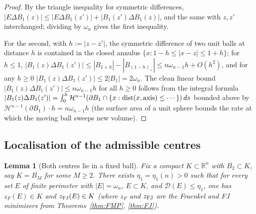 \documentclass[11pt]{article}
\newtheorem{lemma}[theorem]{Lemma}
\theoremstyle{definition}
\newcommand{\R}{\mathbb{R}}
\newcommand{\Hn}{\mathcal H^{n-1}}
\newcommand{\dD}{\mathcal D}
\begin{document}
\begin{proof}
By the triangle inequality for symmetric differences,
\(|E\Delta B_1(z)|\le|E\Delta B_1(z')|+|B_1(z')\Delta B_1(z)|\), and
the same with \(z,z'\) interchanged; dividing by \(\omega_n\) gives
the first inequality.

For the second, with \(h:=|z-z'|\), the symmetric difference of two
unit balls at distance \(h\) is contained in the closed annulus
\(\{x:1-h\le|x-z|\le 1+h\}\); for \(h\le 1\),
\(|B_1(z)\Delta B_1(z')|\le |B_{1+h}|-|B_{(1-h)_+}|
\le n\omega_{n-1}h+O(h^{2})\), and for any \(h\ge0\)
\(|B_1(z)\Delta B_1(z')|\le 2|B_{1}|=2\omega_n\).  The clean linear
bound \(|B_1(z)\Delta B_1(z')|\le n\omega_{n-1}h\) for all
\(h\ge0\) follows from the integral formula
\(|B_1(z)\Delta B_1(z')|=\int_{0}^{h}\Hn(\partial B_1\cap
\{x:{\rm dist}(x,\text{axis})\le\cdots\})\,ds\) bounded above by
\(\Hn(\partial B_1)\cdot h = n\omega_{n-1}h\) (the surface area of a
unit sphere bounds the rate at which the moving ball sweeps new
volume).
\end{proof}

\subsection{Localisation of the admissible centres}

\begin{lemma}[Both centres lie in a fixed ball]\label{lem:localise-centres}
Fix a compact \(K\subset\R^{n}\) with \(\overline{B_{2}}\subset K\),
say \(K=\overline{B_{M}}\) for some \(M\ge2\).  There exists
\(\eta_{1}=\eta_{1}(n)>0\) such that for every set \(E\) of finite
perimeter with \(|E|=\omega_n\), \(E\subset K\), and
\(\dD(E)\le\eta_{1}\), one has \(z_{F}(E)\in K\) and
\(z_{\rm FJ}(E)\in K\) (where \(z_F\) and \(z_{\rm FJ}\) are the
Fraenkel and FJ minimisers from Theorems~\ref{thm:FMP},
\ref{thm:FJ}).
\end{lemma}
\end{document}
